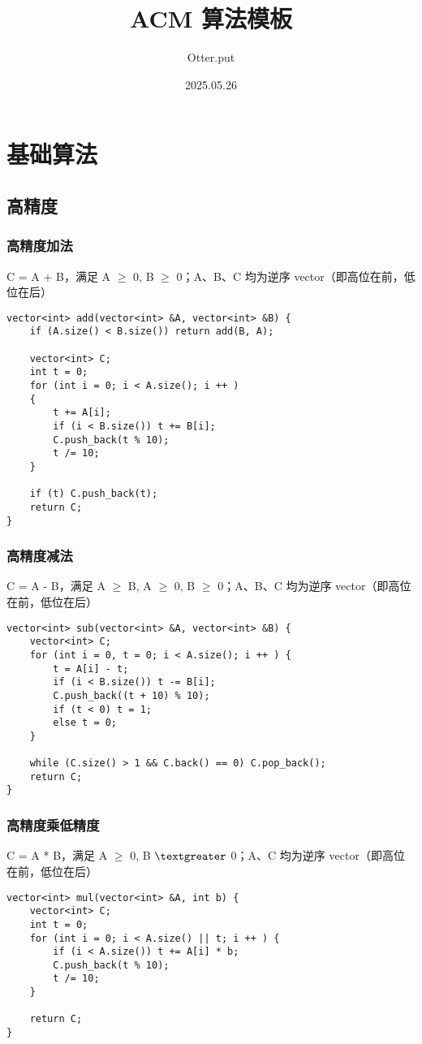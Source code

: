 \documentclass[UTF8]{article}
\title{ACM 算法模板}
\author{Otter.put}
\date{2025.05.26}
\begin{document}
\maketitle

\tableofcontents

\section{基础算法}
\subsection{高精度}

\subsubsection{高精度加法}
C = A + B，满足  A $\ge$ 0, B $\ge$ 0；A、B、C 均为逆序 vector（即高位在前，低位在后）
\begin{lstlisting}[caption=高精度加法]
vector<int> add(vector<int> &A, vector<int> &B) {
    if (A.size() < B.size()) return add(B, A);

    vector<int> C;
    int t = 0;
    for (int i = 0; i < A.size(); i ++ )
    {
        t += A[i];
        if (i < B.size()) t += B[i];
        C.push_back(t % 10);
        t /= 10;
    }

    if (t) C.push_back(t);
    return C;
}
\end{lstlisting}

\subsubsection{高精度减法}
C = A - B，满足  A $\ge$ B,  A $\ge$ 0, B $\ge$ 0；A、B、C 均为逆序 vector（即高位在前，低位在后）
\begin{lstlisting}[caption=高精度减法]
vector<int> sub(vector<int> &A, vector<int> &B) {
    vector<int> C;
    for (int i = 0, t = 0; i < A.size(); i ++ ) {
        t = A[i] - t;
        if (i < B.size()) t -= B[i];
        C.push_back((t + 10) % 10);
        if (t < 0) t = 1;
        else t = 0;
    }

    while (C.size() > 1 && C.back() == 0) C.pop_back();
    return C;
}
\end{lstlisting}

\subsubsection{高精度乘低精度}
C = A * B，满足 A $\ge$ 0, B $\textgreater$ 0；A、C 均为逆序 vector（即高位在前，低位在后）
\begin{lstlisting}[caption=高精度乘低精度]
vector<int> mul(vector<int> &A, int b) {
    vector<int> C;
    int t = 0;
    for (int i = 0; i < A.size() || t; i ++ ) {
        if (i < A.size()) t += A[i] * b;
        C.push_back(t % 10);
        t /= 10;
    }

    return C;
}
\end{lstlisting}
\end{document}
